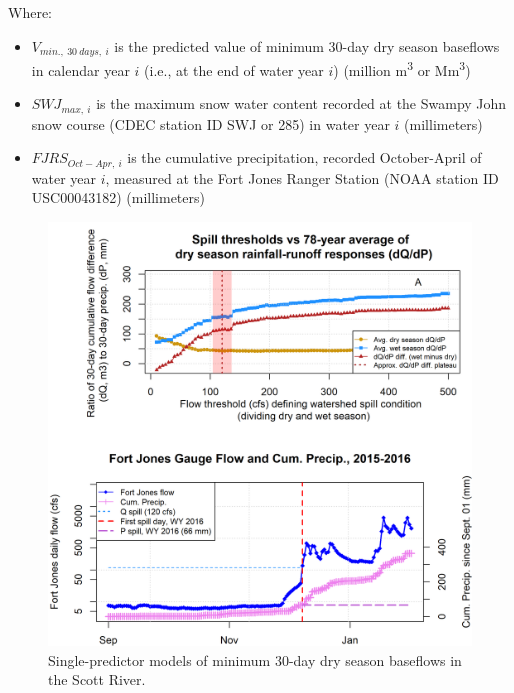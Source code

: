 \documentclass[
]{article}
\providecommand{\tightlist}{%
  \setlength{\itemsep}{0pt}\setlength{\parskip}{0pt}}
\begin{document}
Where:

\begin{itemize}
\tightlist
\item
  \(V_{min.,~30~days,~i}\) is the predicted value of minimum 30-day dry
  season baseflows in calendar year \(i\) (i.e., at the end of water
  year \(i\)) (million m\textsuperscript{3} or Mm\textsuperscript{3})
\item
  \(SWJ_{max,~i}\) is the maximum snow water content recorded at the
  Swampy John snow course (CDEC station ID SWJ or 285) in water year
  \(i\) (millimeters)
\item
  \(FJRS_{Oct-Apr,~i}\) is the cumulative precipitation, recorded
  October-April of water year \(i\), measured at the Fort Jones Ranger
  Station (NOAA station ID USC00043182) (millimeters)
\end{itemize}

\begin{figure}
\includegraphics[width=1\linewidth]{f10} \caption{\label{fig:one_predictor_model} Single-predictor models of minimum 30-day dry season baseflows in the Scott River.}\label{fig:one_predictor_model}
\end{figure}
\end{document}
